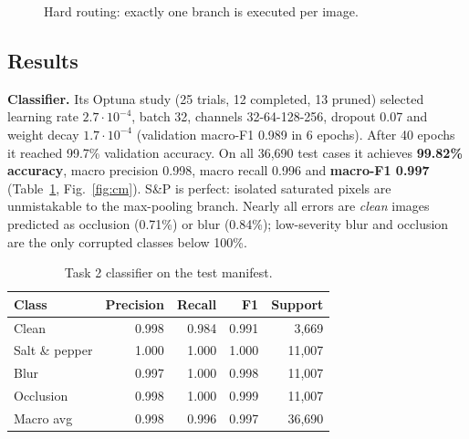 ﻿\documentclass[conference]{IEEEtran}
\begin{document}
\begin{figure}[t]
\centering
{}
\caption{Hard routing: exactly one branch is executed per image.}
\label{fig:route}
\end{figure}

\subsection{Results}
\textbf{Classifier.} Its Optuna study (25 trials, 12 completed, 13 pruned) selected learning rate
$2.7{\cdot}10^{-4}$, batch 32, channels 32-64-128-256, dropout 0.07 and weight decay $1.7{\cdot}10^{-4}$
(validation macro-F1 0.989 in 6 epochs). After 40 epochs it reached 99.7\% validation accuracy. On all
36,690 test cases it achieves \textbf{99.82\% accuracy}, macro precision 0.998, macro recall 0.996 and
\textbf{macro-F1 0.997} (Table~\ref{tab:clf}, Fig.~\ref{fig:cm}). S\&P is perfect: isolated saturated
pixels are unmistakable to the max-pooling branch. Nearly all errors are \emph{clean} images predicted
as occlusion (0.71\%) or blur (0.84\%); low-severity blur and occlusion are the only corrupted classes
below 100\%.

\begin{table}[t]\centering\caption{Task 2 classifier on the test manifest.}\label{tab:clf}\footnotesize
\begin{tabular}{@{}lrrrr@{}}\toprule
Class & Precision & Recall & F1 & Support\\\midrule
Clean & 0.998 & 0.984 & 0.991 & 3,669\\
Salt \& pepper & 1.000 & 1.000 & 1.000 & 11,007\\
Blur & 0.997 & 1.000 & 0.998 & 11,007\\
Occlusion & 0.998 & 1.000 & 0.999 & 11,007\\\midrule
Macro avg & 0.998 & 0.996 & 0.997 & 36,690\\\bottomrule
\end{tabular}\end{table}
\end{document}
